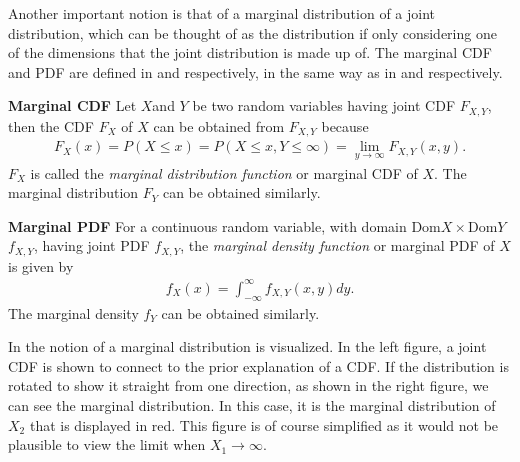 Another important notion is that of a marginal distribution of a joint distribution, which can be thought of as the distribution if only considering one of the dimensions that the joint distribution is made up of. The marginal \gls{CDF} and \gls{PDF} are defined in  and  respectively, in the same way as in \citet[p.~81]{evans2004probability} and \citet[p.~34]{wasserman2010statistics} respectively. 

\begin{definition}\label{def:MarginalCDF}
    \textbf{Marginal \gls{CDF}} 
    Let $X$and $Y$ be two random variables having joint \gls{CDF} $F_{X,Y}$, then the \gls{CDF} $F_X$ of $X$ can be obtained from $F_{X,Y}$ because
    \begin{align*}
        F_X(x) =P(X\leq x)
        =P(X\leq x,Y \leq \infty)
        =\lim_{y\to\infty} F_{X,Y}(x,y).
    \end{align*}
    $F_X$ is called the \emph{marginal distribution function} or marginal \gls{CDF} of $X$. The marginal distribution $F_Y$ can be obtained similarly. 
\end{definition}

\begin{definition}\label{def:MarginalPDF}
    \textbf{Marginal \gls{PDF}}
    For a continuous random variable, with domain $\mathrm{Dom}X\times \mathrm{Dom}Y$ $f_{X,Y}$, having joint \gls{PDF} $f_{X,Y}$, the \emph{marginal density function} or marginal \gls{PDF} of $X$ is given by
    \begin{align*}
        f_X(x) = \int_{-\infty}^\infty f_{X,Y}(x,y)dy.
    \end{align*}
    The marginal density $f_Y$ can be obtained similarly. 
\end{definition}

In  the notion of a marginal distribution is visualized. In the left figure, a joint \gls{CDF} is shown to connect to the prior explanation of a \gls{CDF}. If the distribution is rotated to show it straight from one direction, as shown in the right figure, we can see the marginal distribution. In this case, it is the marginal distribution of $X_2$ that is displayed in red. This figure is of course simplified as it would not be plausible to view the limit when $X_1 \to \infty$.

